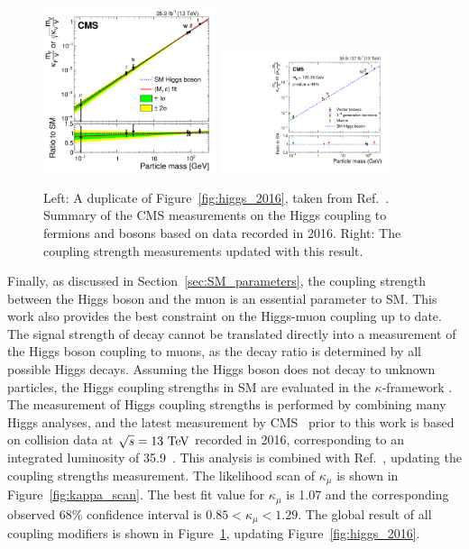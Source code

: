 \begin{figure}[!htb]
    \centering
    \includegraphics[width=0.45\textwidth]{pics/Intro/higgs_coupling_2016.png}
    \includegraphics[width=0.45\textwidth]{pics/results/higgs_coupling_new.pdf}
    \caption{Left: A duplicate of Figure~\ref{fig:higgs_2016}, taken from Ref.~\cite{Sirunyan:2640611}. 
             Summary of the CMS measurements on the Higgs coupling to fermions and bosons based on data recorded in 2016.
             Right: The coupling strength measurements updated with this \hmm result.}
    \label{fig:higgs_coupling_new}
\end{figure}

Finally, as discussed in Section~\ref{sec:SM_parameters}, the coupling strength between the Higgs boson and the muon is an essential parameter to SM.
This work also provides the best constraint on the Higgs-muon coupling up to date.
The signal strength of \hmm decay cannot be translated directly into a measurement of the Higgs boson coupling to muons,
as the \hmm decay ratio is determined by all possible Higgs decays.
Assuming the Higgs boson does not decay to unknown particles, 
the Higgs coupling strengths in SM are evaluated in the $\kappa$-framework \cite{Heinemeyer:2013tqa}.
The measurement of Higgs coupling strengths is performed by combining many Higgs analyses,
and the latest measurement by CMS~\cite{Sirunyan:2640611} prior to this work is based on collision data at $\sqrt{s} = 13~\mbox{TeV}$ recorded in 2016, corresponding to an integrated luminosity of 35.9~\invfb.
This \hmm analysis is combined with Ref.~\cite{Sirunyan:2640611}, updating the coupling strengths measurement.
The likelihood scan of $\kappa_{\mu}$ is shown in Figure~\ref{fig:kappa_scan}.
The best fit value for $\kappa_{\mu}$ is 1.07 and the corresponding observed 68\% confidence interval is $0.85 < \kappa_{\mu} < 1.29$.
The global result of all coupling modifiers is shown in Figure~\ref{fig:higgs_coupling_new}, updating Figure~\ref{fig:higgs_2016}.

